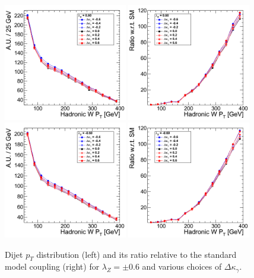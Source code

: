 \begin{figure}[h!t]
  {\centering
    \includegraphics[width=0.48\textwidth]{figs/HadronicWpT_060.png}
    \includegraphics[width=0.48\textwidth]{figs/HadronicWpT_060_ratio.png}
    \includegraphics[width=0.48\textwidth]{figs/HadronicWpT_m060.png}
    \includegraphics[width=0.48\textwidth]{figs/HadronicWpT_m060_ratio.png}
    \caption{Dijet $p_T$ distribution (left) and its ratio relative to 
    the standard model coupling (right) for $\lambda_Z = \pm 0.6$ and various choices of $\Delta{\kappa_\gamma}$.}
    \label{fig:ww_dijetPt_atgcRatio06}}
\end{figure}
